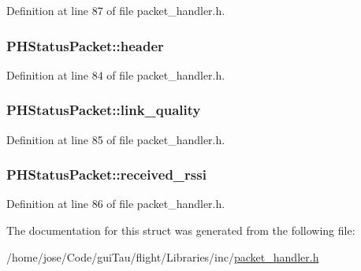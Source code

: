 Definition at line 87 of file packet\-\_\-handler.\-h.

\hypertarget{struct_p_h_status_packet_a01617aa2bca7a093aa2dd7a2e7edc47a}{
\subsubsection[{header}]{ P\-H\-Status\-Packet\-::header}}\label{struct_p_h_status_packet_a01617aa2bca7a093aa2dd7a2e7edc47a}


Definition at line 84 of file packet\-\_\-handler.\-h.

\hypertarget{struct_p_h_status_packet_ac78a8f872dbb6ece46016b5fdc901037}{
\subsubsection[{link\-\_\-quality}]{ P\-H\-Status\-Packet\-::link\-\_\-quality}}\label{struct_p_h_status_packet_ac78a8f872dbb6ece46016b5fdc901037}


Definition at line 85 of file packet\-\_\-handler.\-h.

\hypertarget{struct_p_h_status_packet_a8dcb964e68ef8dbed6c28e6418dc3e2e}{
\subsubsection[{received\-\_\-rssi}]{ P\-H\-Status\-Packet\-::received\-\_\-rssi}}\label{struct_p_h_status_packet_a8dcb964e68ef8dbed6c28e6418dc3e2e}


Definition at line 86 of file packet\-\_\-handler.\-h.



The documentation for this struct was generated from the following file\-:\begin{DoxyCompactItemize}
\item 
/home/jose/\-Code/gui\-Tau/flight/\-Libraries/inc/\hyperlink{packet__handler_8h}{packet\-\_\-handler.\-h}\end{DoxyCompactItemize}
